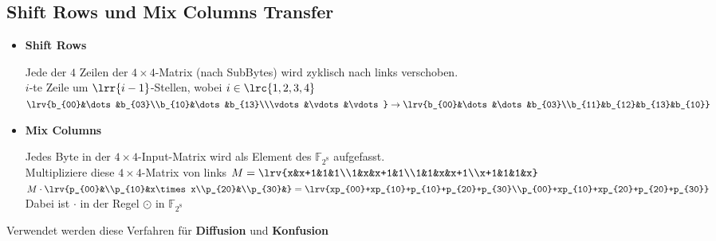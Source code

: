 	\subsection{Shift Rows und Mix Columns Transfer}
		\begin{itemize}
			\item \textbf{Shift Rows}
			
				Jede der $4$ Zeilen der $4\times 4$-Matrix (nach SubBytes) wird zyklisch nach links verschoben.\\
				$i$-te Zeile um $\lrr{i-1}$-Stellen, wobei $i\in\lrc{1,2,3,4}$\\
				$\lrv{b_{00}&\dots&b_{03}\\b_{10}&\dots&b_{13}\\\vdots&\vdots&\vdots}\rightarrow\lrv{b_{00}&\dots&\dots&b_{03}\\b_{11}&b_{12}&b_{13}&b_{10}}$
			\item \textbf{Mix Columns}
			
				Jedes Byte in der $4\times 4$-Input-Matrix wird als Element des $\mathbb{F}_{2^8}$ aufgefasst. \\
				Multipliziere diese $4\times 4$-Matrix von links $M=\lrv{x&x+1&1&1\\1&x&x+1&1\\1&1&x&x+1\\x+1&1&1&x}$\\
				$M\cdot\lrv{p_{00}&\\p_{10}&x\times x\\p_{20}&\\p_{30}&} = \lrv{xp_{00}+xp_{10}+p_{10}+p_{20}+p_{30}\\p_{00}+xp_{10}+xp_{20}+p_{20}+p_{30}}$\\
				Dabei ist $\cdot$ in der Regel $\odot$ in $\mathbb{F}_{2^8}$
		\end{itemize}
		Verwendet werden diese Verfahren für \textbf{Diffusion} und \textbf{Konfusion}

